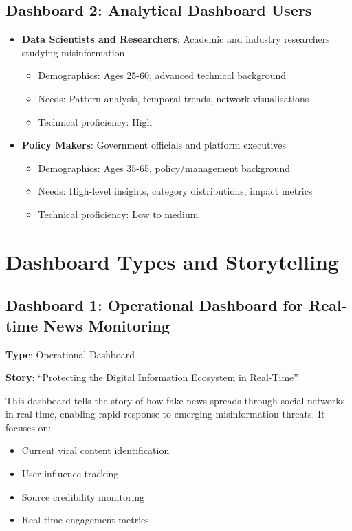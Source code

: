 \documentclass[12pt,a4paper]{article}
\begin{document}
\subsection{Dashboard 2: Analytical Dashboard Users}
\begin{itemize}
    \item \textbf{Data Scientists and Researchers}: Academic and industry researchers studying misinformation
    \begin{itemize}
        \item Demographics: Ages 25-60, advanced technical background
        \item Needs: Pattern analysis, temporal trends, network visualisations
        \item Technical proficiency: High
    \end{itemize}
    
    \item \textbf{Policy Makers}: Government officials and platform executives
    \begin{itemize}
        \item Demographics: Ages 35-65, policy/management background
        \item Needs: High-level insights, category distributions, impact metrics
        \item Technical proficiency: Low to medium
    \end{itemize}
\end{itemize}

\section{Dashboard Types and Storytelling}

\subsection{Dashboard 1: Operational Dashboard for Real-time News Monitoring}

\textbf{Type}: Operational Dashboard

\textbf{Story}: ``Protecting the Digital Information Ecosystem in Real-Time''

This dashboard tells the story of how fake news spreads through social networks in real-time, enabling rapid response to emerging misinformation threats. It focuses on:
\begin{itemize}
    \item Current viral content identification
    \item User influence tracking
    \item Source credibility monitoring
    \item Real-time engagement metrics
\end{itemize}
\end{document}
